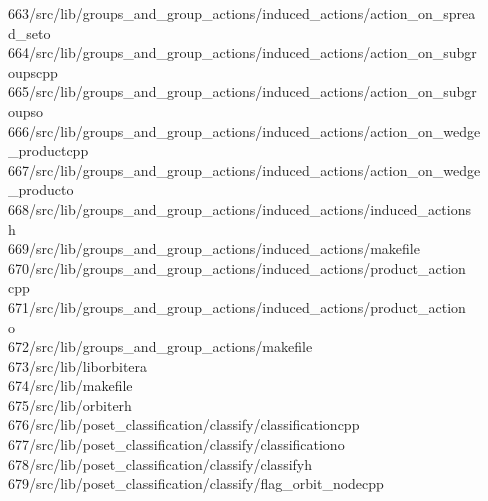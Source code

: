 \begin{tabbing}
663\>/src/lib/groups\_and\_group\_actions/induced\_actions/action\_on\_sprea\\[0pt]
\>d\_seto\\[0pt]
664\>/src/lib/groups\_and\_group\_actions/induced\_actions/action\_on\_subgr\\[0pt]
\>oupscpp\\[0pt]
665\>/src/lib/groups\_and\_group\_actions/induced\_actions/action\_on\_subgr\\[0pt]
\>oupso\\[0pt]
666\>/src/lib/groups\_and\_group\_actions/induced\_actions/action\_on\_wedge\\[0pt]
\>\_productcpp\\[0pt]
667\>/src/lib/groups\_and\_group\_actions/induced\_actions/action\_on\_wedge\\[0pt]
\>\_producto\\[0pt]
668\>/src/lib/groups\_and\_group\_actions/induced\_actions/induced\_actions\\[0pt]
\>h\\[0pt]
669\>/src/lib/groups\_and\_group\_actions/induced\_actions/makefile\\[0pt]
670\>/src/lib/groups\_and\_group\_actions/induced\_actions/product\_action\\[0pt]
\>cpp\\[0pt]
671\>/src/lib/groups\_and\_group\_actions/induced\_actions/product\_action\\[0pt]
\>o\\[0pt]
672\>/src/lib/groups\_and\_group\_actions/makefile\\[0pt]
673\>/src/lib/liborbitera\\[0pt]
674\>/src/lib/makefile\\[0pt]
675\>/src/lib/orbiterh\\[0pt]
676\>/src/lib/poset\_classification/classify/classificationcpp\\[0pt]
677\>/src/lib/poset\_classification/classify/classificationo\\[0pt]
678\>/src/lib/poset\_classification/classify/classifyh\\[0pt]
679\>/src/lib/poset\_classification/classify/flag\_orbit\_nodecpp\\[0pt]

\end{tabbing}
